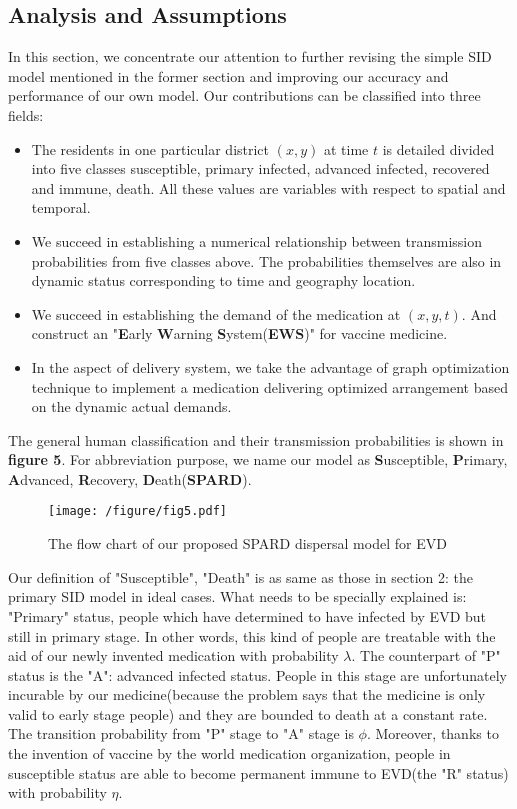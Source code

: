 \subsection{Analysis and Assumptions}
In this section, we concentrate our attention to further revising the simple SID model mentioned in the former section and improving our accuracy and performance of our own model. Our contributions can be classified into three fields:
\begin{itemize}
  \item The residents in one particular district $(x,y)$ at time $t$ is detailed divided into five classes susceptible, primary infected, advanced infected, recovered and immune, death. All these values are variables with respect to spatial and temporal.
  \item We succeed in establishing a numerical relationship between transmission probabilities from five classes above. The probabilities themselves are also in dynamic status corresponding to time and geography location.
  \item We succeed in establishing the demand of the medication at $(x,y,t)$. And construct an "\textbf{E}arly \textbf{W}arning \textbf{S}ystem(\textbf{EWS})" for vaccine medicine.
  \item In the aspect of delivery system, we take the advantage of graph optimization technique to implement a medication delivering optimized arrangement based on the dynamic actual demands.
 \end{itemize}
 The general human classification and their transmission probabilities is shown in \textbf{figure 5}. For abbreviation purpose, we name our model as \textbf{S}usceptible, \textbf{P}rimary, \textbf{A}dvanced, \textbf{R}ecovery, \textbf{D}eath(\textbf{SPARD}).
\begin{figure}[htbp]
\centering
\texttt{[image: /figure/fig5.pdf]}
\caption{The flow chart of our proposed SPARD dispersal model for EVD}\label{fig:5}
\end{figure}
Our definition of "Susceptible", "Death" is as same as those in section 2: the primary SID model in ideal cases. What needs to be specially explained is: "Primary" status, people which have determined to have infected by EVD but still in primary stage. In other words, this kind of people are treatable with the aid of our newly invented medication with probability $\lambda$. The counterpart of "P" status is the "A": advanced infected status. People in this stage are unfortunately incurable by our medicine(because the problem says that the medicine is only valid to early stage people) and they are bounded to death at a constant rate. The transition probability from "P" stage to "A" stage is $\phi$. Moreover, thanks to the invention of vaccine by the world medication organization, people in susceptible status are able to become permanent immune to EVD(the "R" status) with probability $\eta$. 

